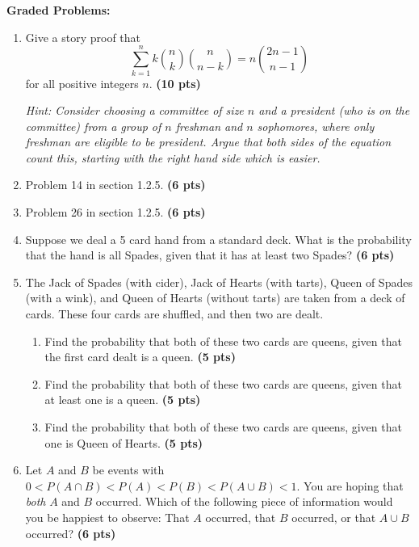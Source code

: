 \documentclass[11pt]{article}
\begin{document}
\noindent\textbf{Graded Problems:}


\begin{enumerate}

\item 
Give a story proof that
\[
\sum_{k=1}^n k \binom{n}{k}\binom{n}{n-k} = n \binom{2n -1}{n-1}
\]
for all positive integers $n$. \textbf{(10 pts)}

\emph{Hint:  Consider choosing a committee of size $n$ and a president (who is on the committee) from a
group of $n$ freshman and $n$ sophomores, where only freshman are eligible to
be president.  Argue that both sides of the equation count this, starting
with the right hand side which is easier.}

\item Problem 14 in section 1.2.5. \textbf{(6 pts)}

\item Problem 26 in section 1.2.5. \textbf{(6 pts)}

\item Suppose we deal a 5 card hand from a standard deck.  What is the
probability that the hand is all Spades, given that it has at least two
Spades? \textbf{(6 pts)}

\item The Jack of Spades (with cider), Jack of Hearts (with tarts), 
Queen of Spades (with a wink), and Queen of Hearts (without tarts) are
taken from a deck of cards.  These four cards are shuffled, and then two are
dealt.

\begin{enumerate}
\item Find the probability that both of these two cards are queens, given
that the first card dealt is a queen. \textbf{(5 pts)}

\item Find the probability that both of these two cards are queens, given
that at least one is a queen. \textbf{(5 pts)}

\item Find the probability that both of these two cards are queens, given
that one is Queen of Hearts. \textbf{(5 pts)}

\end{enumerate}

\item Let $A$ and $B$ be events with $0 < P(A \cap B) < P(A) < P(B) < P(A \cup
B) < 1$.  You are hoping that \emph{both} $A$ and $B$ occurred.  Which of the
following piece of information would you be happiest to observe:  That $A$
occurred, that $B$ occurred, or that $A\cup B$ occurred? \textbf{(6 pts)}



\end{enumerate}
\end{document}
